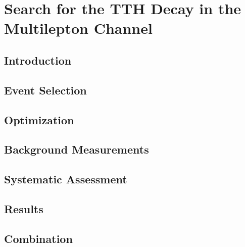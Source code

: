 \chapter[Search for the TTH Decay in the Multilepton Channel][Search for the TTH Decay in the Multilepton Channel]{Search for the TTH Decay in the Multilepton Channel}

\section{Introduction}

\section{Event Selection}
\section{Optimization}
\section{Background Measurements}
\section{Systematic Assessment}
\section{Results}
\section{Combination}
